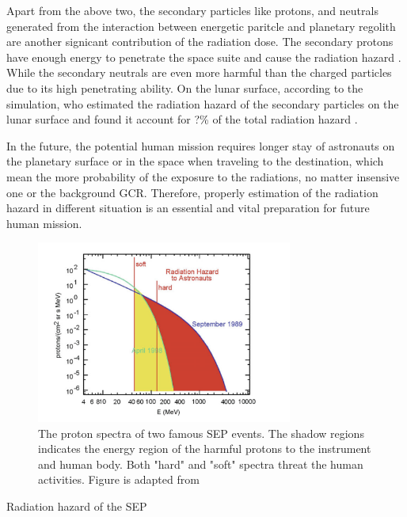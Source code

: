Apart from the above two, the secondary particles like protons, and neutrals generated from the interaction between energetic paritcle and planetary regolith are another signicant contribution of the radiation dose. The secondary protons have enough energy to penetrate the space suite and cause the radiation hazard \citep{Xu2022Frontier}. While the secondary neutrals are even more harmful than the charged particles due to its high penetrating ability.
On the lunar surface, according to the simulation, who estimated the radiation hazard of the secondary particles on the lunar surface and found it account for ?\% of the total radiation hazard \citep{Hassler2014}. 

In the future, the potential human mission requires longer stay of astronauts on the planetary surface or in the space when traveling to the destination, which mean the more probability of the exposure to the radiations, no matter insensive one or the background GCR. Therefore, properly estimation of the radiation hazard in different situation is an essential and vital preparation for future human mission.









\begin{figure}
	\centering
	\includegraphics[width = 0.75\textwidth]{images/SEP-radiation_hazard.png}
	\caption[The proton spectra in two SEP events indicating the possible radiation energy]{The proton spectra of two famous SEP events. The shadow regions indicates the energy region of the harmful protons to the instrument and human body. Both "hard" and "soft" spectra threat the human activities. Figure is adapted from \citep{Reames2021LNP}}
	\label{Fig:SEP-radiation_hazard}
\end{figure}
Radiation hazard of the SEP 



